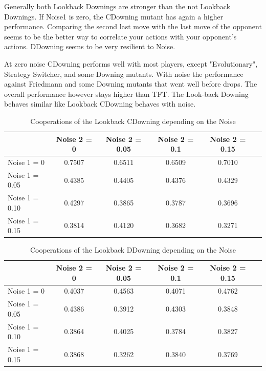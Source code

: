 Generally both Lookback Downings are stronger than the not Lookback Downings. If Noise1 is zero, the CDowning mutant has again a higher performance. Comparing the second last move with the last move of the opponent seems to be the better way to correlate your actions with your opponent's actions. DDowning seems to be very resilient to Noise.

At zero noise CDowning performs well with most players, except "Evolutionary", Strategy Switcher, and some Downing mutants. With noise the performance against Friedmann and some Downing mutants that went well before drops. The overall performance however stays higher than TFT. The Look-back Downing behaves similar like Lookback CDowning behaves with noise.

\begin{table}[h]
 \begin{center}
\caption{Cooperations of the Lookback CDowning depending on the Noise} \vspace{3mm}
\begin{tabular}{|l|c|c|c|c|c|}
\hline
   	& Noise 2 = 0 & Noise 2 = 0.05& Noise 2 = 0.1& Noise 2 = 0.15 \\
  \hline
  Noise 1 = 0 	&     0.7507   & 0.6511 &   0.6509&    0.7010 \\
 \hline
  Noise 1 = 0.05	 &      0.4385 &   0.4405 &   0.4376 &   0.4329 \\
 \hline
  Noise 1 = 0.10 	&      0.4297  &  0.3865  &  0.3787  &  0.3696 \\
 \hline
  Noise 1 = 0.15 	&    0.3814  &  0.4120 &   0.3682  &  0.3271 \\
 \hline
\end{tabular}
 \end{center}
\end{table}

\begin{table}[h]
 \begin{center}
\caption{Cooperations of the Lookback DDowning depending on the Noise} \vspace{3mm}
\begin{tabular}{|l|c|c|c|c|c|}
\hline
   	& Noise 2 = 0 & Noise 2 = 0.05& Noise 2 = 0.1& Noise 2 = 0.15 \\
  \hline
  Noise 1 = 0 	&   0.4037 &   0.4563 &   0.4071   & 0.4762 \\
 \hline
  Noise 1 = 0.05	 &     0.4386  &  0.3912 &   0.4303   & 0.3848 \\
 \hline
  Noise 1 = 0.10 	&      0.3864   & 0.4025  &  0.3784 &  0.3827 \\
 \hline
  Noise 1 = 0.15 	&    0.3868 &   0.3262 &   0.3840  &  0.3769 \\
 \hline
\end{tabular}
 \end{center}
\end{table}

